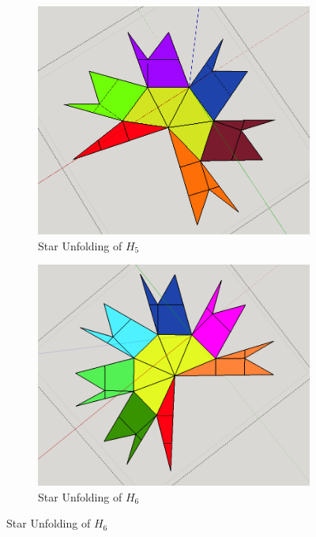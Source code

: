 \documentclass[12 pt]{article}
\begin{document}
\begin{figure}[h]
\begin{subfigure}[t]{0.25\textwidth}
\end{subfigure}%
%
\begin{subfigure}[t]{0.25\textwidth}
\caption{Star Unfolding of $H_5$ }
\includegraphics[scale=0.15]{finalUNP/h5UNP.png}
\end{subfigure}%
\begin{subfigure}[t]{0.25\textwidth}
\caption{Star Unfolding of $H_6$ }
\includegraphics[scale=0.15]{finalUNP/h6UNP.png}
\end{subfigure}
\end{figure}%
\end{document}
